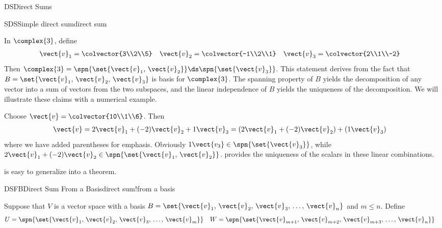\begin{subsect}{DS}{Direct Sums}
%
%
\begin{example}{SDS}{Simple direct sum}{direct sum}
\begin{para}In $\complex{3}$, define
%
\begin{align*}
\vect{v}_1&=\colvector{3\\2\\5}
&
\vect{v}_2&=\colvector{-1\\2\\1}
&
\vect{v}_3&=\colvector{2\\1\\-2}
\end{align*}
%
Then $\complex{3}=\spn{\set{\vect{v}_1,\,\vect{v}_2}}\ds\spn{\set{\vect{v}_3}}$.  This statement derives from the fact that $B=\set{\vect{v}_1,\,\vect{v}_2,\,\vect{v}_3}$ is basis for $\complex{3}$.  The spanning property of $B$ yields the decomposition of any vector into a sum of vectors from the two subspaces, and the linear independence of $B$ yields the uniqueness of the decomposition.  We will illustrate these claims with a numerical example.\end{para}
%
\begin{para}Choose $\vect{v}=\colvector{10\\1\\6}$.  Then
%
\begin{align*}
\vect{v}
&=2\vect{v}_1+(-2)\vect{v}_2+1\vect{v}_3
=\left(2\vect{v}_1+(-2)\vect{v}_2\right)+\left(1\vect{v}_3\right)
\end{align*}
%
where we have added parentheses for emphasis.  Obviously $1\vect{v_3}\in\spn{\set{\vect{v}_3}}$, while $2\vect{v}_1+(-2)\vect{v}_2\in\spn{\set{\vect{v}_1,\,\vect{v}_2}}$.   provides the uniqueness of the scalars in these linear combinations.\end{para}
%
\end{example}
%
\begin{para} is easy to generalize into a theorem.\end{para}
%
\begin{theorem}{DSFB}{Direct Sum From a Basis}{direct sum!from a basis}
\begin{para}Suppose that $V$ is a vector space with a basis
$B=\set{\vect{v}_1,\,\vect{v}_2,\,\vect{v}_3,\,\dots,\,\vect{v}_n}$ and $m\leq n$.  Define
%
\begin{align*}
U&=\spn{\set{\vect{v}_1,\,\vect{v}_2,\,\vect{v}_3,\,\dots,\,\vect{v}_m}}
&
W&=\spn{\set{\vect{v}_{m+1},\,\vect{v}_{m+2},\,\vect{v}_{m+3},\,\dots,\,\vect{v}_n}}

\end{align*}
\end{para}
\end{theorem}
\end{subsect}
